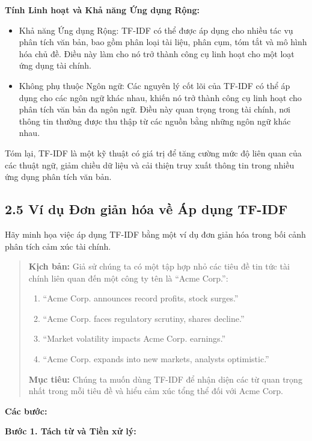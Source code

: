 \textbf{Tính Linh hoạt và Khả năng Ứng dụng Rộng:}

\begin{itemize}
  \item Khả năng Ứng dụng Rộng: TF-IDF có thể được áp dụng cho nhiều tác vụ phân tích văn bản, bao gồm phân loại tài liệu, phân cụm, tóm tắt và mô hình hóa chủ đề. Điều này làm cho nó trở thành công cụ linh hoạt cho một loạt ứng dụng tài chính.
  \item Không phụ thuộc Ngôn ngữ: Các nguyên lý cốt lõi của TF-IDF có thể áp dụng cho các ngôn ngữ khác nhau, khiến nó trở thành công cụ linh hoạt cho phân tích văn bản đa ngôn ngữ. Điều này quan trọng trong tài chính, nơi thông tin thường được thu thập từ các nguồn bằng những ngôn ngữ khác nhau.
\end{itemize}

Tóm lại, TF-IDF là một kỹ thuật có giá trị để tăng cường mức độ liên quan của các thuật ngữ, giảm chiều dữ liệu và cải thiện truy xuất thông tin trong nhiều ứng dụng phân tích văn bản.

\subsection{2.5 Ví dụ Đơn giản hóa về Áp dụng TF-IDF}

Hãy minh họa việc áp dụng TF-IDF bằng một ví dụ đơn giản hóa trong bối cảnh phân tích cảm xúc tài chính.

\begin{quote}
\textbf{Kịch bản:} Giả sử chúng ta có một tập hợp nhỏ các tiêu đề tin tức tài chính liên quan đến một công ty tên là ``Acme Corp.'':

\begin{enumerate}
  \item ``Acme Corp. announces record profits, stock surges.''
  \item ``Acme Corp. faces regulatory scrutiny, shares decline.''
  \item ``Market volatility impacts Acme Corp. earnings.''
  \item ``Acme Corp. expands into new markets, analysts optimistic.''
\end{enumerate}

\textbf{Mục tiêu:} Chúng ta muốn dùng TF-IDF để nhận diện các từ quan trọng nhất trong mỗi tiêu đề và hiểu cảm xúc tổng thể đối với Acme Corp.
\end{quote}

\textbf{Các bước:}

\textbf{Bước 1. Tách từ và Tiền xử lý:}

